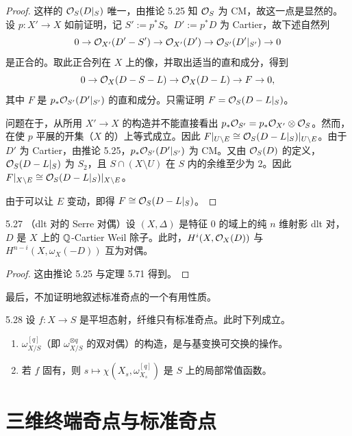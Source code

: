 \begin{proof}
这样的 $\mathcal{O}_S(D|_S)$ 唯一，由推论 5.25 知 $\mathcal{O}_S$ 为 CM，故这一点是显然的。设 $p\colon X'\to X$ 如前证明，记 $S':=p^*S$。$D':=p^*D$ 为 Cartier，故下述自然列
\[
0\to\mathcal{O}_{X'}(D'-S')\to\mathcal{O}_{X'}(D')\to\mathcal{O}_{S'}(D'|_{S'})\to0
\]
是正合的。取此正合列在 $X$ 上的像，并取出适当的直和成分，得到
\[
0\to\mathcal{O}_X(D-S-L)\to\mathcal{O}_X(D-L)\to F\to0,
\]
其中 $F$ 是 $p_*\mathcal{O}_{S'}(D'|_{S'})$ 的直和成分。只需证明 $F=\mathcal{O}_S(D-L|_S)$。

问题在于，从所用 $X'\to X$ 的构造并不能直接看出 $p_*\mathcal{O}_{S'}=p_*\mathcal{O}_{X'}\otimes\mathcal{O}_S$。然而，在使 $p$ 平展的开集（$X$ 的）上等式成立。因此 $F|_{U\setminus E}\cong\mathcal{O}_S(D-L|_S)|_{U\setminus E}$。由于 $D'$ 为 Cartier，由推论 5.25，$p_*\mathcal{O}_{S'}(D'|_{S'})$ 为 CM。又由 $\mathcal{O}_S(D)$ 的定义，$\mathcal{O}_S(D-L|_S)$ 为 $S_2$，且 $S\cap(X\setminus U)$ 在 $S$ 内的余维至少为 $2$。因此 $F|_{X\setminus E}\cong\mathcal{O}_S(D-L|_S)|_{X\setminus E}$。

由于可以让 $E$ 变动，即得 $F\cong\mathcal{O}_S(D-L|_S)$。
\end{proof}

\begin{corollaryp}{5.27}
（dlt 对的 Serre 对偶）设 $(X,\Delta)$ 是特征 $0$ 的域上的纯 $n$ 维射影 dlt 对，$D$ 是 $X$ 上的 $\mathbb{Q}$-Cartier Weil 除子。此时，$H^i(X,\mathcal{O}_X(D))$ 与 $H^{n-i}(X,\omega_X(-D))$ 互为对偶。
\end{corollaryp}

\begin{proof}
这由推论 5.25 与定理 5.71 得到。
\end{proof}

最后，不加证明地叙述标准奇点的一个有用性质。

\begin{theorem*}[{[Kol83]}]{5.28}
设 $f\colon X\to S$ 是平坦态射，纤维只有标准奇点。此时下列成立。
\begin{enumerate}[label=(\arabic*),leftmargin=*]
\item $\omega^{[q]}_{X/S}$（即 $\omega^{\otimes q}_{X/S}$ 的双对偶）的构造，是与基变换可交换的操作。
\item 若 $f$ 固有，则 $s\mapsto\chi(X_s,\omega^{[q]}_{X_s})$ 是 $S$ 上的局部常值函数。
\end{enumerate}
\end{theorem*}

\section{三维终端奇点与标准奇点}

